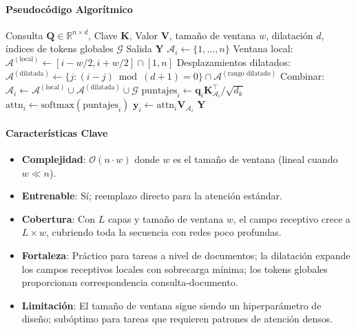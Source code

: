\paragraph{Pseudocódigo Algorítmico}

\begin{algorithm}[H]
\caption{Longformer: Ventana Deslizante + Dilatada + Global}
\begin{algorithmic}[1]
\Require Consulta $\mathbf{Q} \in \mathbb{R}^{n \times d}$, Clave $\mathbf{K}$, Valor $\mathbf{V}$, tamaño de ventana $w$, dilatación $d$, índices de tokens globales $\mathcal{G}$
\Ensure Salida $\mathbf{Y}$
        \State $\mathcal{A}_i \gets \{1, \ldots, n\}$ 
    \Else
        \State Ventana local: $\mathcal{A}^{(\text{local})} \gets [i - w/2, i + w/2] \cap [1, n]$
        \State Desplazamientos dilatados: $\mathcal{A}^{(\text{dilatada})} \gets \{j : (i-j) \bmod (d+1) = 0\} \cap \mathcal{A}^{(\text{rango dilatado})}$
        \State Combinar: $\mathcal{A}_i \gets \mathcal{A}^{(\text{local})} \cup \mathcal{A}^{(\text{dilatada})} \cup \mathcal{G}$
    \EndIf
    \State $\text{puntajes}_i \gets \mathbf{q}_i \mathbf{K}_{\mathcal{A}_i}^\top / \sqrt{d_k}$
    \State $\text{attn}_i \gets \text{softmax}(\text{puntajes}_i)$
    \State $\mathbf{y}_i \gets \text{attn}_i \mathbf{V}_{\mathcal{A}_i}$
\EndFor
\Return $\mathbf{Y}$
\end{algorithmic}
\end{algorithm}

\paragraph{Características Clave}

\begin{itemize}[leftmargin=*]
    \item \textbf{Complejidad}: $\mathcal{O}(n \cdot w)$ donde $w$ es el tamaño de ventana (lineal cuando $w \ll n$).
    \item \textbf{Entrenable}: Sí; reemplazo directo para la atención estándar.
    \item \textbf{Cobertura}: Con $L$ capas y tamaño de ventana $w$, el campo receptivo crece a $L \times w$, cubriendo toda la secuencia con redes poco profundas.
    \item \textbf{Fortaleza}: Práctico para tareas a nivel de documentos; la dilatación expande los campos receptivos locales con sobrecarga mínima; los tokens globales proporcionan correspondencia consulta-documento.
    \item \textbf{Limitación}: El tamaño de ventana sigue siendo un hiperparámetro de diseño; subóptimo para tareas que requieren patrones de atención densos.
\end{itemize}

